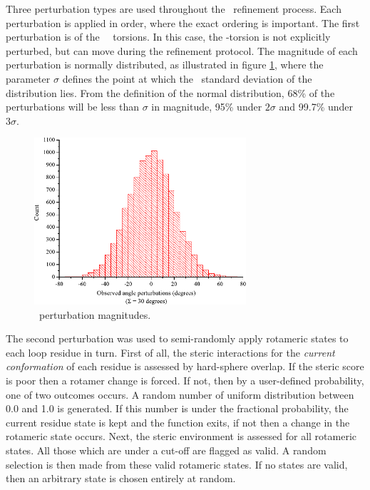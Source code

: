 Three perturbation types are used throughout the \prearcus\ refinement process. Each perturbation is applied in order, where the exact ordering is important. The first perturbation is of the \phipsi\ \mainchain\ torsions. In this case, the \Omg-torsion is not explicitly perturbed, but can move during the refinement protocol. The magnitude of each perturbation is normally distributed, as illustrated in figure \ref{fig:prearcus:pert_mag}, where the parameter $\sigma$ defines the point at which the \first\ standard deviation of the distribution lies.
From the definition of the normal distribution, 68\% of the perturbations will be less than $\sigma$ in magnitude, 95\% under $2\sigma$ and 99.7\% under $3\sigma$.

\begin{figure}[hptb]
\begin{center}
\includegraphics[width=0.7\textwidth]{06-PreArcus/sidechain/sidechain_pert_mag.pdf}
\end{center}
\caption{\Sidechain\ perturbation magnitudes.}
\label{fig:prearcus:pert_mag}
\end{figure}

The second perturbation was used to semi-randomly apply rotameric states to each loop residue in turn. First of all, the steric interactions for the \emph{current conformation} of each residue is assessed by hard-sphere overlap. If the steric score is poor then a rotamer change is forced. If not, then by a user-defined probability, one of two outcomes occurs. A random number of uniform distribution between 0.0 and 1.0 is generated. If this number is under the fractional probability, the
current residue state is kept and the function exits, if not then a change in the rotameric state occurs. Next, the steric environment is assessed for all rotameric states. All those which are under a cut-off are flagged as valid. A random selection is then made from these valid rotameric states.
If no states are valid, then an arbitrary state is chosen entirely at random.

